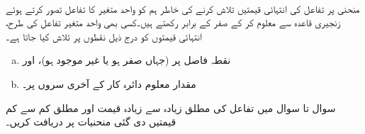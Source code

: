 \\
منحنی  پر تفاعل   کی انتہائی قیمتیں تلاش کرنے کی خاطر  ہم  کو واحد متغیر  کا تفاعل تصور کرتے ہوئے   زنجیری قاعدہ سے   معلوم کر کے صفر کے برابر  رکھتے  ہیں۔کسی بھی واحد متغیر تفاعل کی طرح، انتہائی قیمتوں کو درج ذیل نقطوں پر تلاش کیا جاتا ہے۔
\begin{enumerate}[a.]
\item
نقطہ فاصل پر  (جہاں  صفر ہو یا غیر موجود ہو)،   اور
\item
مقدار معلوم دائرہ کار کے آخری سروں پر۔
\end{enumerate}
سوال  تا سوال  میں تفاعل کی مطلق زیادہ سے زیادہ قیمت اور مطلق کم سے کم قیمتیں دی گئی منحنیات پر  دریافت کریں۔


